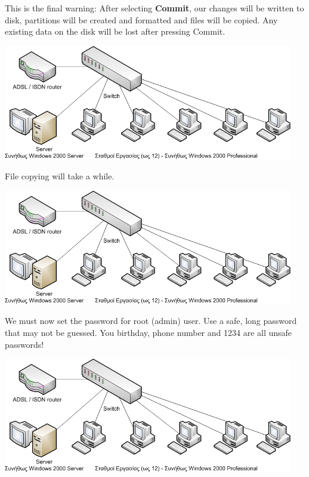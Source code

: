 \documentclass[a4paper,twoside,12pt]{article}
\begin{document}
This is the final warning: After selecting \textbf{Commit}, our changes will be written to disk, partitions will be created and formatted and files will be copied. Any existing data on the disk will be lost after pressing Commit.

\begin{center}
\includegraphics[width=0.95\textwidth]{images/main/school-lab}
\end{center}

File copying will take a while.

\begin{center}
\includegraphics[width=0.95\textwidth]{images/main/school-lab}
\end{center}

We must now set the password for root (admin) user. Use a safe, long password that may not be guessed. You birthday, phone number and 1234 are all unsafe passwords!

\begin{center}
\includegraphics[width=0.95\textwidth]{images/main/school-lab}
\end{center}
\end{document}
